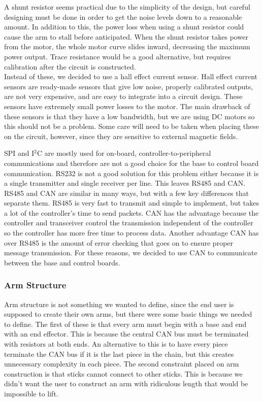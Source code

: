 A shunt resistor seems practical due to the simplicity of the design, but careful designing must be done in order to get the noise levels down to a reasonable amount. In addition to this, the power loss when using a shunt resistor could cause the arm to stall before anticipated. When the shunt resistor takes power from the motor, the whole motor curve slides inward, decreasing the maximum power output. Trace resistance would be a good alternative, but requires calibration after the circuit is constructed. \\
\newline
Instead of these, we decided to use a hall effect current sensor. Hall effect current sensors are ready-made sensors that give low noise, properly calibrated outputs, are not very expensive, and are easy to integrate into a circuit design. These sensors have extremely small power losses to the motor. The main drawback of these sensors is that they have a low bandwidth, but we are using DC motors so this should not be a problem. Some care will need to be taken when placing these on the circuit, however, since they are sensitive to external magnetic fields.

SPI and I$^2$C are mostly used for on-board, controller-to-peripheral communications and therefore are not a good choice for the base to control board communication. RS232 is not a good solution for this problem either because it is a single transmitter and single receiver per line. This leaves RS485 and CAN. \\
\newline
RS485 and CAN are similar in many ways, but with a few key differences that separate them. RS485 is very fast to transmit and simple to implement, but takes a lot of the controller's time to send packets. CAN has the advantage because the controller and transceiver control the transmission independent of the controller so the controller has more free time to process data. Another advantage CAN has over RS485 is the amount of error checking that goes on to ensure proper message transmission. For these reasons, we decided to use CAN to communicate between the base and control boards.

\subsubsection{Arm Structure}
Arm structure is not something we wanted to define, since the end user is supposed to create their own arms, but there were some basic things we needed to define. The first of these is that every arm must begin with a base and end with an end effector. This is because the central CAN bus must be terminated with resistors at both ends. An alternative to this is to have every piece terminate the CAN bus if it is the last piece in the chain, but this creates unnecessary complexity in each piece. The second constraint placed on arm construction is that sticks cannot connect to other sticks. This is because we didn't want the user to construct an arm with ridiculous length that would be impossible to lift.

